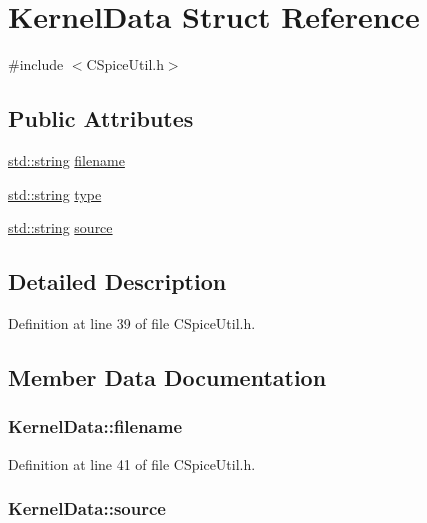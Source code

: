 \hypertarget{struct_kernel_data}{\section{Kernel\+Data Struct Reference}
\label{struct_kernel_data}
}


{\ttfamily \#include $<$C\+Spice\+Util.\+h$>$}

\subsection*{Public Attributes}
\begin{DoxyCompactItemize}
\item 
\hyperlink{glext_8h_ae84541b4f3d8e1ea24ec0f466a8c568b}{std\+::string} \hyperlink{struct_kernel_data_af4c846d6ee67df117a4ef8ffee027485}{filename}
\item 
\hyperlink{glext_8h_ae84541b4f3d8e1ea24ec0f466a8c568b}{std\+::string} \hyperlink{struct_kernel_data_ae5f44d63e81e8b9a360f2f90383bc90e}{type}
\item 
\hyperlink{glext_8h_ae84541b4f3d8e1ea24ec0f466a8c568b}{std\+::string} \hyperlink{struct_kernel_data_a984dfda085a99f59eefc81a02fec4159}{source}
\end{DoxyCompactItemize}


\subsection{Detailed Description}


Definition at line 39 of file C\+Spice\+Util.\+h.



\subsection{Member Data Documentation}
\hypertarget{struct_kernel_data_af4c846d6ee67df117a4ef8ffee027485}{
\subsubsection[{filename}]{ Kernel\+Data\+::filename}}\label{struct_kernel_data_af4c846d6ee67df117a4ef8ffee027485}


Definition at line 41 of file C\+Spice\+Util.\+h.

\hypertarget{struct_kernel_data_a984dfda085a99f59eefc81a02fec4159}{
\subsubsection[{source}]{ Kernel\+Data\+::source}}\label{struct_kernel_data_a984dfda085a99f59eefc81a02fec4159}


